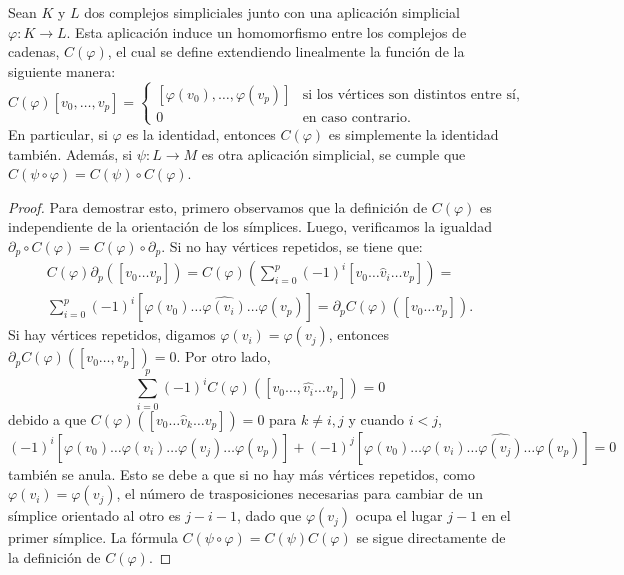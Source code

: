 \begin{proposicion}
	\label{prop:simpl_app_hom}
	Sean \(K\) y \(L\) dos complejos simpliciales junto con una aplicación simplicial \(\varphi: K \to L\). Esta aplicación induce un homomorfismo entre los complejos de cadenas, \(C(\varphi)\), el cual se define extendiendo linealmente la función de la siguiente manera:
	\[
		C(\varphi)[v_0, \ldots, v_p] =
		\begin{cases}
			[\varphi(v_0), \ldots, \varphi(v_p)] & \text{si los vértices son distintos entre sí}, \\
			0 & \text{en caso contrario}.
		\end{cases}
	\]
	En particular, si \(\varphi\) es la identidad, entonces \(C(\varphi)\) es simplemente la identidad también. Además, si \(\psi: L \longrightarrow M\) es otra aplicación simplicial, se cumple que \(C(\psi \circ \varphi) = C(\psi) \circ C(\varphi)\).
\end{proposicion}
\begin{proof}
	Para demostrar esto, primero observamos que la definición de \(C(\varphi)\) es independiente de la orientación de los símplices. Luego, verificamos la igualdad \(\partial_p \circ C(\varphi) = C(\varphi) \circ \partial_p\). Si no hay vértices repetidos, se tiene que:
	\begin{gather*}
		C(\varphi) \partial_p([v_0 \ldots v_p]) = C(\varphi) \left( \sum_{i=0}^p (-1)^i [v_0 \ldots \hat{v}_i \ldots v_p] \right) = \\
		\sum_{i=0}^p (-1)^i [\varphi(v_0) \ldots \widehat{\varphi(v_i)} \ldots \varphi(v_p)] = \partial_p C(\varphi)([v_0 \ldots v_p]).
	\end{gather*}
	Si hay vértices repetidos, digamos \(\varphi(v_i) = \varphi(v_j)\), entonces \(\partial_p C(\varphi)([v_0 \ldots, v_p]) = 0\). Por otro lado,
	\[
	\sum_{i=0}^p (-1)^i C(\varphi)([v_0 \ldots, \hat{v_i} \ldots v_p]) = 0
	\]
	debido a que \(C(\varphi)([v_0 \ldots \hat{v}_k \ldots v_p]) = 0\) para \(k \neq i,j\) y cuando \(i < j\),
	\[
	(-1)^i [\varphi(v_0) \ldots \widehat{\varphi(v_i)} \ldots \varphi(v_j) \ldots \varphi(v_p)] + (-1)^j [\varphi(v_0) \ldots \varphi(v_i) \ldots \widehat{\varphi(v_j)} \ldots \varphi(v_p)] = 0
	\]
	también se anula. Esto se debe a que si no hay más vértices repetidos, como \(\varphi(v_i) = \varphi(v_j)\), el número de trasposiciones necesarias para cambiar de un símplice orientado al otro es \(j-i-1\), dado que \(\varphi(v_j)\) ocupa el lugar \(j-1\) en el primer símplice. La fórmula \(C(\psi\circ\varphi)=C(\psi)C(\varphi)\) se sigue directamente de la definición de \(C(\varphi)\).
\end{proof}
